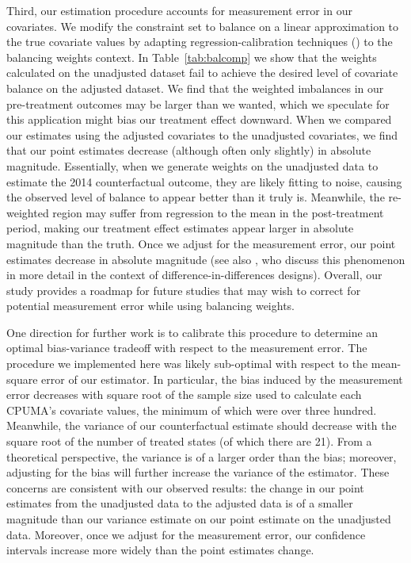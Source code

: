 \documentclass[aoas]{imsart}
\theoremstyle{plain}
\theoremstyle{remark}
\begin{document}
Third, our estimation procedure accounts for measurement error in our covariates. We modify the constraint set to balance on a linear approximation to the true covariate values by adapting regression-calibration techniques (\cite{gleser1992importance}) to the balancing weights context. In Table~\ref{tab:balcomp} we show that the weights calculated on the unadjusted dataset fail to achieve the desired level of covariate balance on the adjusted dataset. We find that the weighted imbalances in our pre-treatment outcomes may be larger than we wanted, which we speculate for this application might bias our treatment effect downward. When we compared our estimates using the adjusted covariates to the unadjusted covariates, we find that our point estimates decrease (although often only slightly) in absolute magnitude. Essentially, when we generate weights on the unadjusted data to estimate the 2014 counterfactual outcome, they are likely fitting to noise, causing the observed level of balance to appear better than it truly is. Meanwhile, the re-weighted region may suffer from regression to the mean in the post-treatment period, making our treatment effect estimates appear larger in absolute magnitude than the truth. Once we adjust for the measurement error, our point estimates decrease in absolute magnitude (see also \cite{daw2018matching}, who discuss this phenomenon in more detail in the context of difference-in-differences designs). Overall, our study provides a roadmap for future studies that may wish to correct for potential measurement error while using balancing weights. 

One direction for further work is to calibrate this procedure to determine an optimal bias-variance tradeoff with respect to the measurement error. The procedure we implemented here was likely sub-optimal with respect to the mean-square error of our estimator. In particular, the bias induced by the measurement error decreases with square root of the sample size used to calculate each CPUMA's covariate values, the minimum of which were over three hundred. Meanwhile, the variance of our counterfactual estimate should decrease with the square root of the number of treated states (of which there are 21). From a theoretical perspective, the variance is of a larger order than the bias; moreover, adjusting for the bias will further increase the variance of the estimator. These concerns are consistent with our observed results: the change in our point estimates from the unadjusted data to the adjusted data is of a smaller magnitude than our variance estimate on our point estimate on the unadjusted data. Moreover, once we adjust for the measurement error, our confidence intervals increase more widely than the point estimates change.
\end{document}
